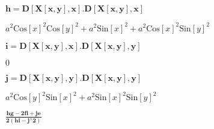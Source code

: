 \documentclass{article}
\begin{document}
\begin{doublespace}
\noindent\(\pmb{h = D[X[x, y], x].D[X[x, y], x]}\)
\end{doublespace}

\begin{doublespace}
\noindent\(a^2 \text{Cos}[x]^2 \text{Cos}[y]^2+a^2 \text{Sin}[x]^2+a^2 \text{Cos}[x]^2 \text{Sin}[y]^2\)
\end{doublespace}

\begin{doublespace}
\noindent\(\pmb{i = D[X[x, y], x].D[X[x, y], y]}\)
\end{doublespace}

\begin{doublespace}
\noindent\(0\)
\end{doublespace}

\begin{doublespace}
\noindent\(\pmb{j = D[X[x, y], y].D[X[x, y], y]}\)
\end{doublespace}

\begin{doublespace}
\noindent\(a^2 \text{Cos}[y]^2 \text{Sin}[x]^2+a^2 \text{Sin}[x]^2 \text{Sin}[y]^2\)
\end{doublespace}

\begin{doublespace}
\noindent\(\pmb{\frac{h g - 2 f i + j e}{2(h i-j{}^{\wedge}2)}}\)
\end{doublespace}
\end{document}
